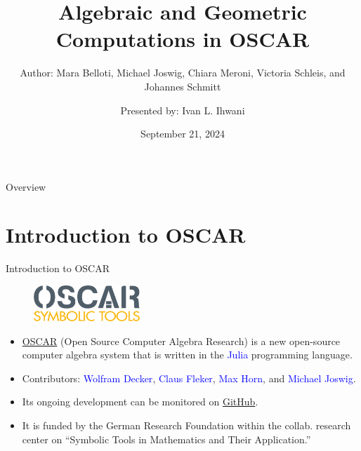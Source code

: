 \documentclass[aspectratio=169,xcolor=dvipsnames]{beamer}
\title[Algebraic \& Geo. Comp. in OSCAR]{Algebraic and Geometric Computations in OSCAR} %
\subtitle{Author: Mara Belloti, Michael Joswig, Chiara Meroni, Victoria Schleis, and Johannes Schmitt}
\author[Ivan L. Ihwani]{Presented by: Ivan L. Ihwani}
\institute[SIAM NEWS SEPTEMBER 2023]{Department of Mathematics \newline National Central University}
\date{September 21, 2024} %
\begin{document}
\begin{frame}[plain]
    \titlepage
\end{frame}

\begin{frame}{Overview}
    \tableofcontents
\end{frame}

\section{Introduction to OSCAR}
\begin{frame}{Introduction to OSCAR}
\begin{figure}[h]
\includegraphics[width=4cm]{logos/OSCAR_logo.png}
\end{figure}
    \begin{itemize}
        \item \textcolor{blue}{\href{https://www.oscar-system.org/}{OSCAR}} (Open Source Computer Algebra Research) is a new open-source computer algebra system that is written in the \textcolor{blue}{Julia} programming language.
        \item Contributors: \textcolor{blue}{Wolfram Decker}, \textcolor{blue}{Claus Fleker}, \textcolor{blue}{Max Horn}, and \textcolor{blue}{Michael Joswig}. 
        \item Its ongoing development can be monitored on \href{https://github.com/oscar-system}{GitHub}.
        \item It is funded by the German Research Foundation within the collab. research center on \enquote{Symbolic Tools in Mathematics and Their Application.}
    \end{itemize}
\end{frame}
\end{document}
